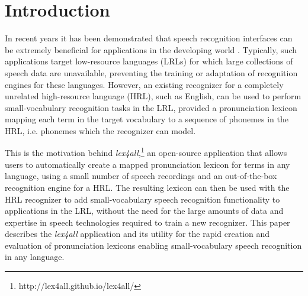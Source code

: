 \documentclass[11pt]{article}
\begin{document}
\section{Introduction}
\label{sec:intro}

In recent years it has been demonstrated that speech recognition interfaces can be extremely beneficial for applications in the developing world
 \cite{case4st4d,Sherwani09,bali13}. 
Typically, 
such applications target low-resource languages (LRLs) for which large collections of speech data are unavailable, preventing the training or adaptation of recognition engines for these languages.
However, 
an existing recognizer for a completely unrelated high-resource language (HRL), such as English, can be used to perform small-vocabulary recognition tasks in the LRL,
provided a pronunciation lexicon mapping each term in the target vocabulary to a sequence of phonemes in the HRL, i.e. phonemes which the recognizer can model. 

This is the motivation behind \textit{lex4all},\footnote{http://lex4all.github.io/lex4all/} an open-source application that allows users to automatically create a mapped pronunciation lexicon for terms in any language, using a small number of speech recordings and an out-of-the-box recognition engine for a HRL. The resulting lexicon can then be used with the HRL recognizer to add small-vocabulary speech recognition functionality to applications in the LRL, without the need for the large amounts of data and expertise in speech technologies required to train a new recognizer. This paper describes the \textit{lex4all} application and its utility for the rapid
creation and evaluation of pronunciation lexicons enabling small-vocabulary speech recognition in any language.
\end{document}
